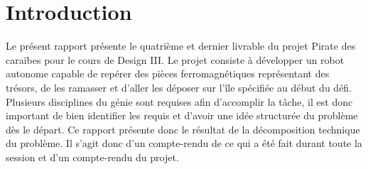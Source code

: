 \chapter{Introduction}
Le présent rapport présente le quatrième et dernier livrable du projet Pirate des caraïbes pour le cours de Design III.
Le projet consiste à développer un robot autonome capable de repérer des pièces ferromagnétiques représentant des trésors,
de les ramasser et d'aller les déposer sur l'île spécifiée au début du défi. Plusieurs disciplines du génie sont requises afin d'accomplir la tâche,
il est donc important de bien identifier les requis et d'avoir une idée structurée du problème dès le départ. Ce rapport présente donc le résultat de la décomposition technique du problème.
Il s'agit donc d'un compte-rendu de ce qui a été fait durant toute la session et d'un compte-rendu du projet.
